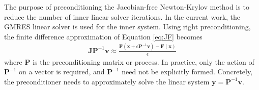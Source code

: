 \documentclass[sn-mathphys,Numbered]{sn-jnl}%
\newcommand{\bb}{\boldsymbol}
\begin{document}

The purpose of preconditioning the Jacobian-free Newton-Krylov method is to reduce the number of inner linear solver iterations.
In the current work, the GMRES linear solver is used for the inner system.
Using right preconditioning, the finite difference approximation of Equation \ref{eq:JF} becomes
\begin{eqnarray}
	\bb{J} \bb{P}^{-1} \bb{v}
	\approx
	\frac{\bb{F}(\bb{x} + \epsilon \bb{P}^{-1} \bb{v}) - \bb{F}(\bb{x})}{\epsilon}
\end{eqnarray}
where $\bb{P}$ is the preconditioning matrix or process.
In practice, only the action of $\bb{P}^{-1}$ on a vector is required, and $\bb{P}^{-1}$ need not be explicitly formed.
Concretely, the preconditioner needs to approximately solve the linear system $\bb{y} = \bb{P}^{-1} \bb{v}$.
\end{document}
